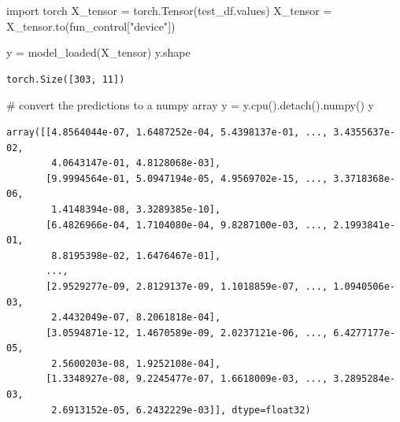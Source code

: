\documentclass[
  letterpaper,
  DIV=11,
  numbers=noendperiod]{scrreprt}
\newenvironment{Shaded}{\begin{snugshade}}{\end{snugshade}}
\newcommand{\CommentTok}[1]{\textcolor[rgb]{0.37,0.37,0.37}{#1}}
\newcommand{\ImportTok}[1]{\textcolor[rgb]{0.00,0.46,0.62}{#1}}
\newcommand{\NormalTok}[1]{\textcolor[rgb]{0.00,0.23,0.31}{#1}}
\newcommand{\OperatorTok}[1]{\textcolor[rgb]{0.37,0.37,0.37}{#1}}
\newcommand{\StringTok}[1]{\textcolor[rgb]{0.13,0.47,0.30}{#1}}
\begin{document}
\begin{Shaded}
\begin{Highlighting}[]
\ImportTok{import}\NormalTok{ torch}
\NormalTok{X\_tensor }\OperatorTok{=}\NormalTok{ torch.Tensor(test\_df.values)}
\NormalTok{X\_tensor }\OperatorTok{=}\NormalTok{ X\_tensor.to(fun\_control[}\StringTok{"device"}\NormalTok{])}
\end{Highlighting}
\end{Shaded}

\begin{Shaded}
\begin{Highlighting}[]
\NormalTok{y }\OperatorTok{=}\NormalTok{ model\_loaded(X\_tensor)}
\NormalTok{y.shape}
\end{Highlighting}
\end{Shaded}

\begin{verbatim}
torch.Size([303, 11])
\end{verbatim}

\begin{Shaded}
\begin{Highlighting}[]
\CommentTok{\# convert the predictions to a numpy array}
\NormalTok{y }\OperatorTok{=}\NormalTok{ y.cpu().detach().numpy()}
\NormalTok{y}
\end{Highlighting}
\end{Shaded}

\begin{verbatim}
array([[4.8564044e-07, 1.6487252e-04, 5.4398137e-01, ..., 3.4355637e-02,
        4.0643147e-01, 4.8128068e-03],
       [9.9994564e-01, 5.0947194e-05, 4.9569702e-15, ..., 3.3718368e-06,
        1.4148394e-08, 3.3289385e-10],
       [6.4826966e-04, 1.7104080e-04, 9.8287100e-03, ..., 2.1993841e-01,
        8.8195398e-02, 1.6476467e-01],
       ...,
       [2.9529277e-09, 2.8129137e-09, 1.1018859e-07, ..., 1.0940506e-03,
        2.4432049e-07, 8.2061818e-04],
       [3.0594871e-12, 1.4670589e-09, 2.0237121e-06, ..., 6.4277177e-05,
        2.5600203e-08, 1.9252108e-04],
       [1.3348927e-08, 9.2245477e-07, 1.6618009e-03, ..., 3.2895284e-03,
        2.6913152e-05, 6.2432229e-03]], dtype=float32)
\end{verbatim}
\end{document}
